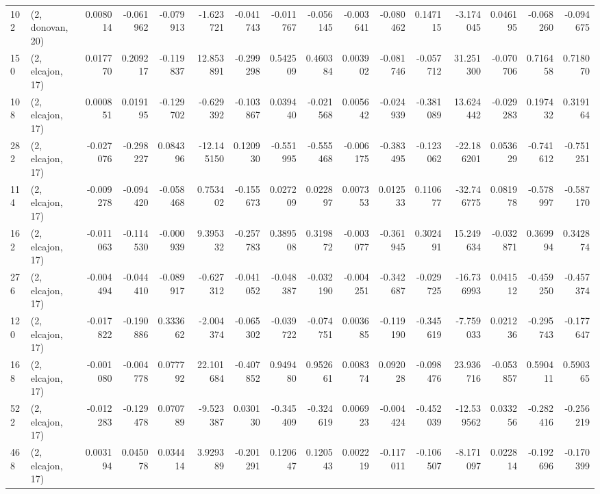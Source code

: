 \begin{tabular}{llrrrrrrrrrrrrrr}
102 &  (2, donovan, 20) &   0.008014 & -0.061962 & -0.079913 &   -1.623721 & -0.041743 &  -0.011767 &  -0.056145 & -0.003641 & -0.080462 &  0.147115 &   -3.174045 &  0.046195 &  -0.068260 &  -0.094675 \\
150 &  (2, elcajon, 17) &   0.017770 &  0.209217 & -0.119837 &   12.853891 & -0.299298 &   0.542509 &   0.460384 &  0.003902 & -0.081746 & -0.057712 &   31.251300 & -0.070706 &   0.716458 &   0.718070 \\
108 &  (2, elcajon, 17) &   0.000851 &  0.019195 & -0.129702 &   -0.629392 & -0.103867 &   0.039440 &  -0.021568 &  0.005642 & -0.024939 & -0.381089 &   13.624442 & -0.029283 &   0.197432 &   0.319164 \\
282 &  (2, elcajon, 17) &  -0.027076 & -0.298227 &  0.084396 &  -12.145150 &  0.120930 &  -0.551995 &  -0.555468 & -0.006175 & -0.383495 & -0.123062 &  -22.186201 &  0.053629 &  -0.741612 &  -0.751251 \\
114 &  (2, elcajon, 17) &  -0.009278 & -0.094420 & -0.058468 &    0.753402 & -0.155673 &   0.027209 &   0.022897 &  0.007353 &  0.012533 &  0.110677 &  -32.746775 &  0.081978 &  -0.578997 &  -0.587170 \\
162 &  (2, elcajon, 17) &  -0.011063 & -0.114530 & -0.000939 &    9.395332 & -0.257783 &   0.389508 &   0.319872 & -0.003077 & -0.361945 &  0.302491 &   15.249634 & -0.032871 &   0.369994 &   0.342874 \\
276 &  (2, elcajon, 17) &  -0.004494 & -0.044410 & -0.089917 &   -0.627312 & -0.041052 &  -0.048387 &  -0.032190 & -0.004251 & -0.342687 & -0.029725 &  -16.736993 &  0.041512 &  -0.459250 &  -0.457374 \\
120 &  (2, elcajon, 17) &  -0.017822 & -0.190886 &  0.333662 &   -2.004374 & -0.065302 &  -0.039722 &  -0.074751 &  0.003685 & -0.119190 & -0.345619 &   -7.759033 &  0.021236 &  -0.295743 &  -0.177647 \\
168 &  (2, elcajon, 17) &  -0.001080 & -0.004778 &  0.077792 &   22.101684 & -0.407852 &   0.949480 &   0.952661 &  0.008374 &  0.092028 & -0.098476 &   23.936716 & -0.053857 &   0.590411 &   0.590365 \\
522 &  (2, elcajon, 17) &  -0.012283 & -0.129478 &  0.070789 &   -9.523387 &  0.030130 &  -0.345409 &  -0.324619 &  0.006923 & -0.004424 & -0.452039 &  -12.539562 &  0.033256 &  -0.282416 &  -0.256219 \\
468 &  (2, elcajon, 17) &   0.003194 &  0.045078 &  0.034414 &    3.929389 & -0.201291 &   0.120647 &   0.120543 &  0.002219 & -0.117011 & -0.106507 &   -8.171097 &  0.022814 &  -0.192696 &  -0.170399 \\

\end{tabular}

